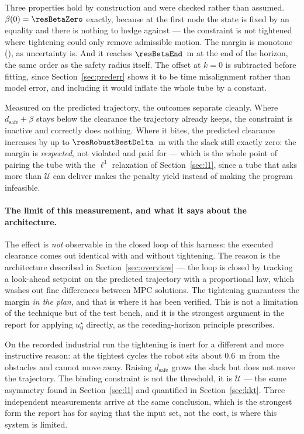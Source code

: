 \documentclass[11pt,a4paper]{article}
\newcommand{\dsafe}{d_{\mathrm{safe}}}
\begin{document}

Three properties hold by construction and were checked rather than assumed. $\beta(0)=\resBetaZero$ exactly,
because at the first node the state is fixed by an equality and there is nothing to hedge against --- the
constraint is not tightened where tightening could only remove admissible motion. The margin is monotone
(\resBetaMonotone), as uncertainty is. And it reaches $\resBetaEnd$~m at the end of the horizon, the same
order as the safety radius itself. The offset at $k=0$ is subtracted before fitting, since
Section~\ref{sec:prederr} shows it to be time misalignment rather than model error, and including it would
inflate the whole tube by a constant.


Measured on the predicted trajectory, the outcomes separate cleanly. Where $\dsafe+\beta$ stays below the
clearance the trajectory already keeps, the constraint is inactive and correctly does nothing. Where it
bites, the predicted clearance increases by up to $\resRobustBestDelta$~m with the slack still exactly zero:
the margin is \emph{respected}, not violated and paid for --- which is the whole point of pairing the tube
with the $\ell^1$ relaxation of Section~\ref{sec:l1}, since a tube that asks more than $\mathcal{U}$ can
deliver makes the penalty yield instead of making the program infeasible.

\paragraph{The limit of this measurement, and what it says about the architecture.} The effect is
\emph{not} observable in the closed loop of this harness: the executed clearance comes out identical with and
without tightening. The reason is the architecture described in Section~\ref{sec:overview} --- the loop is
closed by tracking a look-ahead setpoint on the predicted trajectory with a proportional law, which washes
out fine differences between MPC solutions. The tightening guarantees the margin \emph{in the plan}, and that
is where it has been verified. This is not a limitation of the technique but of the test bench, and it is the
strongest argument in the report for applying $u^\star_0$ directly, as the receding-horizon principle
prescribes.

On the recorded industrial run the tightening is inert for a different and more instructive reason: at the
tightest cycles the robot sits about $0.6$~m from the obstacles and cannot move away. Raising $\dsafe$ grows
the slack but does not move the trajectory. The binding constraint is not the threshold, it is
$\mathcal{U}$ --- the same asymmetry found in Section~\ref{sec:l1} and quantified in Section~\ref{sec:kkt}.
Three independent measurements arrive at the same conclusion, which is the strongest form the report has for
saying that the input set, not the cost, is where this system is limited.
\end{document}
